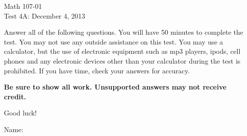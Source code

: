 \documentclass[12pt]{article}
\begin{document}
\pagestyle{empty}


\begin{center}
\begin{large}
Math 107-01\\
Test 4A: December 4, 2013
\end{large}
\end{center}

\begin{small} Answer all of the following questions.  You will have 50 minutes to complete the
test. You may not use any outside assistance on this test.  You may use a
calculator, but the use of
electronic equipment such as mp3 players, ipods, cell phones and any
electronic devices other than your calculator during the test is
prohibited.  If you have time, check your answers for accuracy.

\textbf{Be sure to show all work. Unsupported answers may not
receive credit.}

Good luck!\end{small}

\vspace{ .15 in}
Name: \underline{\qquad \qquad \qquad \qquad \qquad \qquad \qquad \qquad \qquad \qquad}\\

\vspace{ .15 in}
\end{document}
